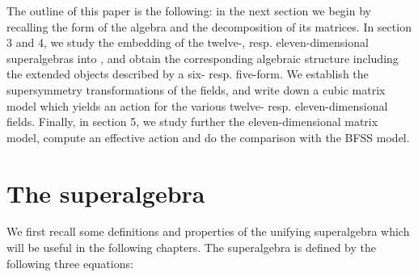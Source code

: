 \documentclass[a4paper,11pt]{article}
\begin{document}
The outline of this paper is the following: in the next section we begin by recalling the form of 
the \coordHE{} algebra and the decomposition of its matrices. In section 3 and 4, we study 
the embedding of the twelve-, resp. eleven-dimensional superalgebras into \coordHE{}, 
and obtain the corresponding algebraic structure including the extended objects described by a six- resp. five-form. 
We establish the supersymmetry transformations of the fields, and write down a cubic matrix model which 
yields an action for the various twelve- resp. eleven-dimensional fields. 
Finally, in section 5, we study further the eleven-dimensional matrix model, compute an effective action and do 
the comparison with the BFSS model.

\section{The \coordHE{} superalgebra}
We first recall some definitions and properties of the unifying superalgebra \coordHE{} 
which will be useful in the following chapters. The superalgebra is defined by the following three equations:  
\end{document}
